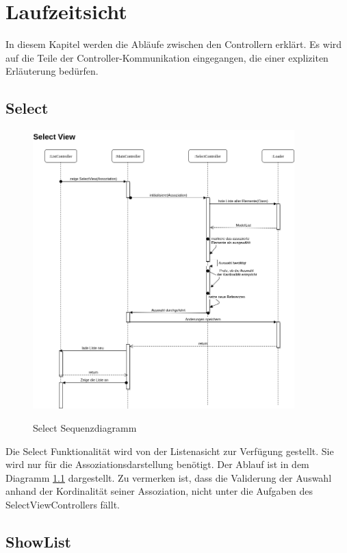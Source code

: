 \chapter{Laufzeitsicht}
In diesem Kapitel werden die Abläufe zwischen den Controllern erklärt. Es wird auf die Teile der Controller-Kommunikation eingegangen, 
die einer expliziten Erläuterung bedürfen.
\section{Select}

\begin{figure}[htb!]
	\caption{Select Sequenzdiagramm}
	\includegraphics[width=0.9\textwidth]{content/pictures/SelectSeq}
	\label{pic:selectSeq_diag}
\end{figure}

Die Select Funktionalität wird von der Listenasicht zur Verfügung gestellt. Sie wird nur für die Assoziationsdarstellung benötigt. 
Der Ablauf ist in dem Diagramm \ref{pic:selectSeq_diag} dargestellt. Zu vermerken ist, dass die Validerung der Auswahl anhand der
Kordinalität seiner Assoziation, nicht unter die Aufgaben des SelectViewControllers fällt.  

\section{ShowList}

